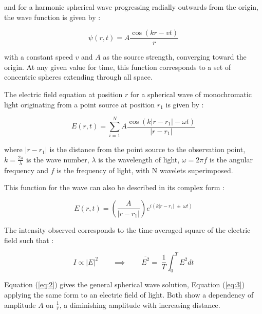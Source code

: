 \documentclass[12pt]{article}
\begin{document}
and for a harmonic spherical wave progressing radially outwards from the origin, the wave function is given by \cite{hecht2012optics}:

\begin{equation}\label{eq:2}
    \psi(r,t) = A \frac{\cos(kr - v t)}{r}
\end{equation}

with a constant speed \( v \) and \( A \) as the source strength, converging toward the origin. At any given value for time, this function corresponds to a set of concentric spheres extending through all space. \cite{hecht2012optics}

The electric field equation  at position \( r \) for a spherical wave of monochromatic light originating from a point source at position \( r_1 \) is given by \cite{reportguide7}:

\begin{equation} \label{eq:3}
    E(r,t) = \sum_{i=1}^N A \frac{\cos(k \lvert r-r_1 \rvert - \omega t)}{\lvert r - r_1 \rvert}
\end{equation}

where \( \lvert r - r_1 \rvert \) is the distance from the point source to the observation point, \( k = \frac{2\pi}{\lambda} \) is the wave number, \( \lambda \) is the wavelength of light, \( \omega = 2\pi f \) is the angular frequency and \( f \) is the frequency of light, with N wavelets superimposed. \cite{reportguide7}

This function for the wave can also be described in its complex form \cite{hecht2012optics}:

\begin{equation}\label{eq:4}
    E(r,t) = \left( \frac{A}{\lvert r-r_1 \rvert} \right) e^{i(k\lvert r -r_1 \rvert \;\pm\; \omega t)}
\end{equation}

The intensity observed corresponds to the time-averaged square of the electric field such that \cite{reportguide7}:

\begin{equation} \label{eq:5}
    I \propto \lvert E \rvert^2 \qquad \implies \qquad \overline{E^2} = \; \frac{1}{T} \int_0^T E^2 dt
\end{equation}

Equation (\ref{eq:2}) gives the general spherical wave solution, Equation (\ref{eq:3}) applying the same form to an electric field of light. Both show a dependency of amplitude \( A \) on \( \frac{1}{r} \), a diminishing amplitude with increasing distance.
\end{document}
